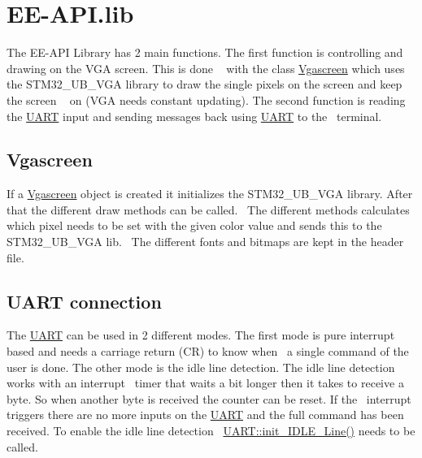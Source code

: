\hypertarget{_e_e-_a_p_i_8lib_library_sec}{}\section{E\+E-\/\+A\+P\+I.\+lib}\label{_e_e-_a_p_i_8lib_library_sec}
The E\+E-\/\+A\+PI Library has 2 main functions. The first function is controlling and drawing on the V\+GA screen. This is done ~\newline
 with the class \mbox{\hyperlink{class_vgascreen}{Vgascreen}} which uses the S\+T\+M32\+\_\+\+U\+B\+\_\+\+V\+GA library to draw the single pixels on the screen and keep the screen ~\newline
 on (V\+GA needs constant updating). The second function is reading the \mbox{\hyperlink{namespace_u_a_r_t}{U\+A\+RT}} input and sending messages back using \mbox{\hyperlink{namespace_u_a_r_t}{U\+A\+RT}} to the~\newline
 terminal.~\newline
 ~\newline
 \hypertarget{_e_e-_a_p_i_8lib_vga_sec}{}\subsection{Vgascreen}\label{_e_e-_a_p_i_8lib_vga_sec}
If a \mbox{\hyperlink{class_vgascreen}{Vgascreen}} object is created it initializes the S\+T\+M32\+\_\+\+U\+B\+\_\+\+V\+GA library. After that the different draw methods can be called.~\newline
 The different methods calculates which pixel needs to be set with the given color value and sends this to the S\+T\+M32\+\_\+\+U\+B\+\_\+\+V\+GA lib.~\newline
 The different fonts and bitmaps are kept in the header file.~\newline
 ~\newline
 \hypertarget{index_uart_sec}{}\subsection{U\+A\+R\+T connection}\label{index_uart_sec}
The \mbox{\hyperlink{namespace_u_a_r_t}{U\+A\+RT}} can be used in 2 different modes. The first mode is pure interrupt based and needs a carriage return (CR) to know when~\newline
 a single command of the user is done. The other mode is the idle line detection. The idle line detection works with an interrupt~\newline
 timer that waits a bit longer then it takes to receive a byte. So when another byte is received the counter can be reset. If the~\newline
 interrupt triggers there are no more inputs on the \mbox{\hyperlink{namespace_u_a_r_t}{U\+A\+RT}} and the full command has been received. To enable the idle line detection~\newline
 \mbox{\hyperlink{namespace_u_a_r_t_aae0befbeb6fc7e852f7a200e9a9f4c7c}{U\+A\+R\+T\+::init\+\_\+\+I\+D\+L\+E\+\_\+\+Line()}} needs to be called.~\newline
 ~\newline
 